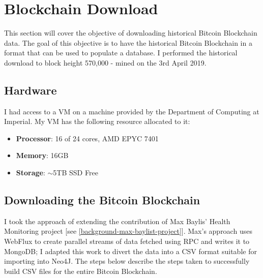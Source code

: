 \chapter{Blockchain Download}\label{section-blockchain-download}
This section will cover the objective of downloading historical Bitcoin Blockchain data. The goal of this objective is to have the historical Bitcoin Blockchain in a format that can be used to populate a database. I performed the historical download to block height 570,000 - mined on the 3rd April 2019. 

\section{Hardware}\label{satoshi-specs}
I had access to a VM on a machine provided by the Department of Computing at Imperial.  My VM has the following resource allocated to it:
\begin{itemize}
    \item \textbf{Processor}: 16 of 24 cores, AMD EPYC 7401
    \item \textbf{Memory}: 16GB
    \item \textbf{Storage}: $\sim$5TB SSD Free
\end{itemize}

\section{Downloading the Bitcoin Blockchain}
I took the approach of extending the contribution of Max Baylis' Health Monitoring project [see \ref{background-max-baylist-project}]. Max's approach uses WebFlux to create parallel streams of data fetched using RPC and writes it to MongoDB; I adapted this work to divert the data into a CSV format suitable for importing into Neo4J. The steps below describe the steps taken to successfully build CSV files for the entire Bitcoin Blockchain. 

